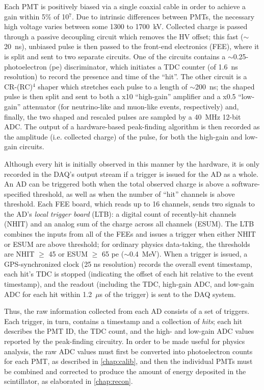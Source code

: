 \documentclass[../thesis.tex]{subfiles}
\begin{document}
Each PMT is positively biased via a single coaxial cable in order to achieve a
gain within 5\% of 10$^7$. Due to intrinsic differences between PMTs, the
necessary high voltage varies between some 1300 to 1700~kV. Collected charge is
passed through a passive decoupling circuit which removes the HV offset; this
fast ($\sim$20~ns), unbiased pulse is then passed to the front-end electronics
(FEE), where it is split and sent to two separate circuits. One of the circuits
contains a $\sim$0.25-photoelectron (pe) discriminator, which initiates a TDC
counter (of 1.6~ns resolution) to record the presence and time of the
``hit''. The other circuit is a CR-(RC)$^4$ shaper which stretches each pulse to
a length of $\sim$200~ns; the shaped pulse is then split and sent to both a x10
``high-gain'' amplifier and a x0.5 ``low-gain'' attenuator (for neutrino-like
and muon-like events, respectively) and, finally, the two shaped and rescaled
pulses are sampled by a 40~MHz 12-bit ADC. The output of a hardware-based
peak-finding algorithm is then recorded as the amplitude (i.e. collected charge)
of the pulse, for both the high-gain and low-gain circuits.

Although every hit is initially observed in this manner by the hardware, it is
only recorded in the DAQ's output stream if a trigger is issued for the AD as a
whole. An AD can be triggered both when the total observed charge is above a
software-specified threshold, as well as when the number of ``hit'' channels is
above threshold. Each FEE board, which reads up to 16 channels, sends two
signals to the AD's \emph{local trigger board} (LTB): a digital count of
recently-hit channels (NHIT) and an analog sum of the charge across all channels
(ESUM). The LTB combines the inputs from all of the FEEs and issues a trigger
when either NHIT or ESUM are above threshold; for ordinary physics data-taking,
the thresholds are NHIT $\geq$ 45 or ESUM $\geq$ 65 pe ($\sim$0.4~MeV). When a
trigger is issued, a GPS-synchronized clock (25 ns resolution) records the
overall event timestamp, each hit's TDC is stopped (indicating the offset of
each hit relative to the event timestamp), and the readout (including the TDC,
high-gain ADC, and low-gain ADC for each hit within 1.2~$\mu$s of the trigger)
is sent to the DAQ system.

Thus, the raw information collected from each AD consists of a set of
triggers. Each trigger, in turn, contains a timestamp and a collection of
\emph{hits}; each hit describes the PMT ID, the TDC count, and the high- and
low-gain ADC values reported by the peak-finding circuitry. In order to be made
useful for physics analysis, the raw ADC values must first be converted into
photoelectron counts for each PMT, as described in \autoref{chap:calib}, and
then the individual PMTs must be combined and corrected to produce the amount of
energy deposited in the scintillator, as elaborated in \autoref{chap:recon}.
\end{document}

